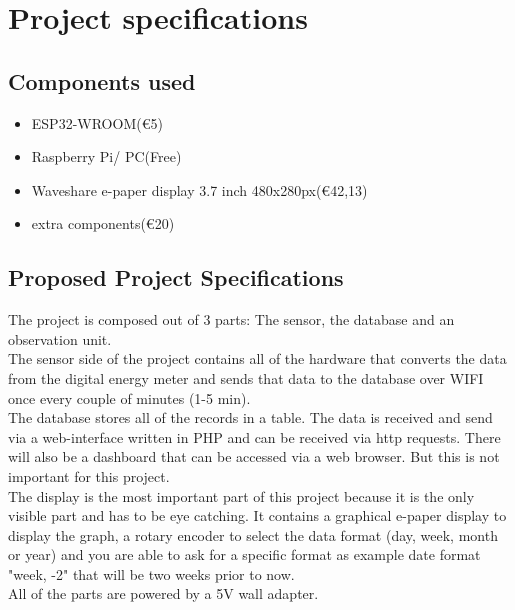 \documentclass[a4paper,twoside, 12pt]{report}
\theoremstyle{break}
\begin{document}
\chapter{Project specifications}
\section{Components used}
\begin{itemize}
  \item ESP32-WROOM\tabto{11cm}(€5)
  \item Raspberry Pi/ PC\tabto{11cm}(Free)
  \item Waveshare e-paper display 3.7 inch 480x280px\tabto{11cm}(€42,13)
  \item extra components\tabto{11cm}(€20)

\end{itemize}

\section{Proposed Project Specifications}
The project is composed out of 3 parts: The sensor, the database and an observation unit. \ \\
The sensor side of the project contains all of the hardware that converts the data from the digital energy meter and sends that data to the database over WIFI once every couple of minutes (1-5 min).
\ \\
The database stores all of the records in a table. The data is received and send via a web-interface written in PHP and can be received via http requests. There will also be a dashboard that can be accessed via a web browser. But this is not important for this project.
\ \\
The display is the most important part of this project because it is the only visible part and has to be eye catching. It contains a graphical e-paper display to display the graph, a rotary encoder to select the data format (day, week, month or year) and you are able to ask for a specific format as example date format "week, -2" that will be two weeks prior to now.
\ \\
All of the parts are powered by a 5V wall adapter.

\begin{landscape}
  
\end{landscape}

\begin{landscape}
  
\end{landscape}
\end{document}
